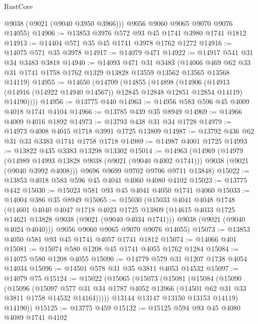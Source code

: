 \begin{lexlean}{RustCore}
\begin{coremodule}
        @9038
        (@9021 (@9040 @3950 @3966)))
      @9056
      @9060
      @9065
      @9070
      @9076
      @14055)
@14906 := @13853 @3976 @572 @93 @45 @1741 @3980 @1741 @1812
@14913 := @14404 @571 @35 @45 @1741 @3978 @1762 @1272
@14916 := @14075 @571 @35 @3978
@14917 := @14079 @471
@14922 := @14917 @541 @31 @34 @3483 @3818
@14940 := @14093
    @471
    @31
    @3483
    (@14066 @469 @62 @33 @31 @1741 @1758 @1762 @1329 @13828 @13559 @13562 @13565 @13568 @14119)
@14955 := @14650
    (@14709
      (@14855
        (@14898
          (@14906
            (@14913 (@14916 (@14922 @14940 @14567)) @12845 @12848 @12851 @12854 @14119)
            @14190))))
@14956 := @13775 @440
@14963 := @14956 @583 @596 @45 @4009 @4018 @1741 @4104
@14966 := @13785 @439 @35 @8949
@14969 := @14966 @4009 @4016 @1892
@14973 := @13793 @438 @31 @34 @1728
@14979 := @14973 @4008 @4015 @1718 @3991 @1725 @13809
@14987 := @13792 @436 @62 @31 @33 @3383 @1741 @1758 @1718
@14989 := @14987 @4001 @1725
@14993 := @13822 @435 @3383 @13298 @13302
@15014 := @14963
    (@14969
      (@14979
        (@14989 @14993 @13828 @9038 (@9021 (@9040 @4002 @1741)))
        @9038
        (@9021 (@9040 @3992 @4008)))
      @9696
      @9699
      @9702
      @9706
      @9711
      @13848)
@15022 := @13853 @4018 @583 @596 @45 @4041 @4060 @4080 @4102
@15023 := @13775 @442
@15030 := @15023 @581 @93 @45 @4041 @4050 @1741 @4060
@15033 := @14004 @386 @35 @8949
@15065 := @15030
    (@15033
      @4041
      @4048
      @1748
      (@14601
        @4040
        @4047
        @1718
        @4023
        @1725
        @13809
        (@14615 @4033 @1725 @14621 @13828 @9038 (@9021 (@9040 @4034 @1741)))
        @9038
        (@9021 (@9040 @4024 @4040)))
      @9056
      @9060
      @9065
      @9070
      @9076
      @14055)
@15073 := @13853 @4050 @581 @93 @45 @1741 @4057 @1741 @1812
@15074 := @14066 @401
@15081 := @15074 @580 @1208 @45 @1741 @4055 @1762 @1284
@15084 := @14075 @580 @1208 @4055
@15090 := @14779 @579 @31 @1207 @1738 @4054 @14034
@15096 := @14501 @578 @31 @35 @3811 @4053 @14532
@15097 := @14079 @75
@15124 := @15022
    (@15065
      (@15073
        (@15081
          (@15084
            (@15090
              (@15096
                (@15097
                  @577
                  @31
                  @34
                  @1787
                  @4052
                  @13966
                  (@14501 @62 @31 @33 @3811 @1758 @14532 @14164)))))
          @13144
          @13147
          @13150
          @13153
          @14119)
        @14190))
@15125 := @13775 @459
@15132 := @15125 @594 @93 @45 @4080 @4089 @1741 @4102

\end{coremodule}
\end{lexlean}
